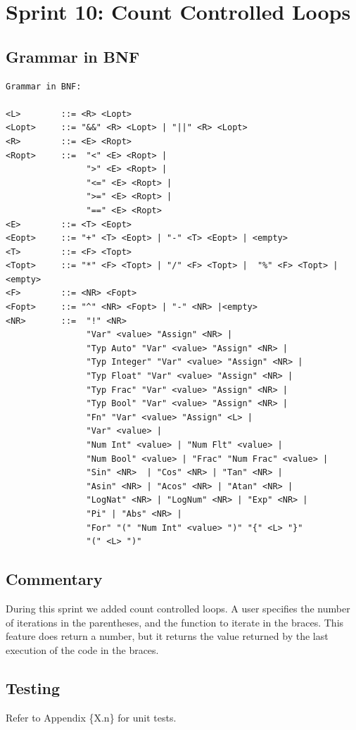 \documentclass[a4paper, oneside, 11pt]{report}
\begin{document}
    \section{Sprint 10: Count Controlled Loops}
    \subsection{Grammar in BNF}
    \begin{verbatim}
Grammar in BNF:

<L>        ::= <R> <Lopt>
<Lopt>     ::= "&&" <R> <Lopt> | "||" <R> <Lopt>
<R>        ::= <E> <Ropt>
<Ropt>     ::=  "<" <E> <Ropt> |
                ">" <E> <Ropt> |
                "<=" <E> <Ropt> |
                ">=" <E> <Ropt> |
                "==" <E> <Ropt>
<E>        ::= <T> <Eopt>
<Eopt>     ::= "+" <T> <Eopt> | "-" <T> <Eopt> | <empty>
<T>        ::= <F> <Topt>
<Topt>     ::= "*" <F> <Topt> | "/" <F> <Topt> |  "%" <F> <Topt> |<empty>
<F>        ::= <NR> <Fopt>
<Fopt>     ::= "^" <NR> <Fopt> | "-" <NR> |<empty>
<NR>       ::=  "!" <NR>
                "Var" <value> "Assign" <NR> |
                "Typ Auto" "Var" <value> "Assign" <NR> |
                "Typ Integer" "Var" <value> "Assign" <NR> |
                "Typ Float" "Var" <value> "Assign" <NR> |
                "Typ Frac" "Var" <value> "Assign" <NR> |
                "Typ Bool" "Var" <value> "Assign" <NR> |
                "Fn" "Var" <value> "Assign" <L> |
                "Var" <value> |
                "Num Int" <value> | "Num Flt" <value> |
                "Num Bool" <value> | "Frac" "Num Frac" <value> |
                "Sin" <NR>  | "Cos" <NR> | "Tan" <NR> |
                "Asin" <NR> | "Acos" <NR> | "Atan" <NR> |
                "LogNat" <NR> | "LogNum" <NR> | "Exp" <NR> |
                "Pi" | "Abs" <NR> |
                "For" "(" "Num Int" <value> ")" "{" <L> "}"
                "(" <L> ")"
    \end{verbatim}
    \subsection{Commentary}
    During this sprint we added count controlled loops. A user specifies the number of iterations in the parentheses, and the function to iterate in the braces. This feature does return a number, but it returns the value returned by the last execution of the code in the braces.

    \subsection{Testing}
    Refer to Appendix \{X.n\} for unit tests.
\end{document}
